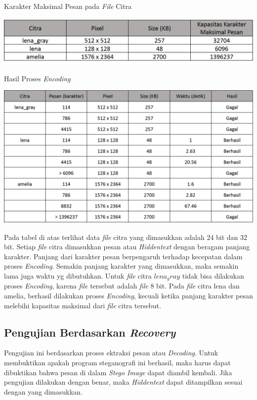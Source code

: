 	\begin{table}[H]
		\centering
		\caption{Karakter Maksimal Pesan pada \emph{File} Citra}
		\includegraphics[width=1.0\textwidth]{gambar/table_karaktermax3}
		\label{tabel_karaktermax2}
	\end{table}

	\begin{table}[H]
		\centering
		\caption{Hasil Proses \emph{Encoding}}
		\includegraphics[width=1.0\textwidth]{gambar/table_hasilencode3}
		\label{tabel_hasilencode3}
	\end{table}

	Pada tabel di atas terlihat data \emph{file} citra yang dimasukkan adalah 24 bit dan 32 bit. Setiap  \emph{file} citra dimasukkan pesan atau \emph{Hiddentext} dengan beragam panjang karakter. Panjang dari karakter pesan berpengaruh terhadap kecepatan dalam proses \emph{Encoding}. Semakin panjang karakter yang dimasukkan, maka semakin lama juga waktu yg dibutuhkan. Untuk \emph{file} citra $lena_ gray$ tidak bisa dilakukan proses \emph{Encoding}, karena \emph{file} tersebut adalah \emph{file} 8 bit. Pada \emph{file} citra lena dan amelia, berhasil dilakukan proses \emph{Encoding}, kecuali ketika panjang karakter pesan melebihi kapasitas maksimal dari \emph{file} citra tersebut.

	\subsection{Pengujian Berdasarkan \emph{Recovery}}
	Pengujian ini berdasarkan proses ektraksi pesan atau \emph{Decoding}. Untuk membuktikan apakah program steganografi ini berhasil, maka harus dapat dibuktikan bahwa pesan di dalam \emph{Stego Image} dapat diambil kembali. Jika pengujian dilakukan dengan benar, maka \emph{Hiddentext} dapat ditampilkan sesuai dengan yang dimasukkan. 
	
